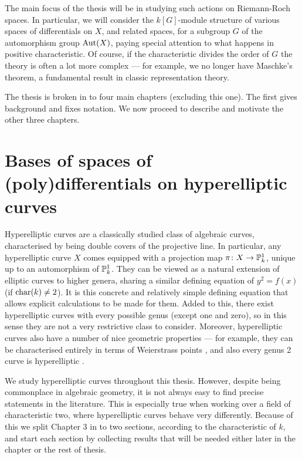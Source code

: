 The main focus of the thesis will be in studying such actions on Riemann-Roch spaces.
In particular, we will consider the $k[G]$-module structure of various spaces of differentials on $X$, and related spaces, for a subgroup $G$ of the automorphism group $\operatorname{Aut}(X)$, paying special attention to what happens in positive characteristic.
Of course, if the characteristic divides the order of $G$ the theory is often a lot more complex --- for example, we no longer have Maschke's theorem, a fundamental result in classic representation theory.

The thesis is broken in to four main chapters (excluding this one).
The first gives background and fixes notation.
We now proceed to describe and motivate the other three chapters.

\section{Bases of spaces of (poly)differentials on hyperelliptic curves}

Hyperelliptic curves are a classically studied class of algebraic curves, characterised by being double covers of the projective line.
In particular, any hyperelliptic curve $X$ comes equipped with a projection map $\pi \colon X \rightarrow {\mathbb P}_k^1$, unique up to an automorphism of ${\mathbb P}_k^1$.
They can be viewed as a natural extension of elliptic curves to higher genera, sharing a similar defining equation of $y^2 = f(x)$ (if $\operatorname{char}(k) \neq 2$).
It is this concrete and relatively simple defining equation that allows explicit calculations to be made for them.
Added to this, there exist hyperelliptic curves with every possible genus (except one and zero), so in this sense they are not a very restrictive class to consider.
Moreover, hyperelliptic curves also have a number of nice geometric properties --- for example, they can be characterised entirely in terms of Weierstrass points \cite[Chap.\ VII, \S 4, ex.\ R]{miranda}, and also every genus 2 curve is hyperelliptic \cite[Prop.\ 7.4.9]{liu}.

We study hyperelliptic curves throughout this thesis.
However, despite being commonplace in algebraic geometry, it is not always easy to find precise statements in the literature.
This is especially true when working over a field of characteristic two, where hyperelliptic curves behave very differently.
Because of this we split Chapter $3$ in to two sections, according to the characteristic of $k$, and start each section by collecting results that will be needed either later in the chapter or the rest of thesis.

